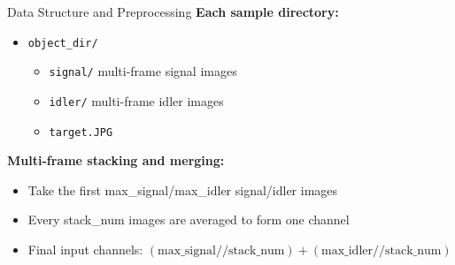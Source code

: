 \documentclass{beamer}
\begin{document}
\begin{frame}{Data Structure and Preprocessing}
\textbf{Each sample directory:}
\begin{itemize}
  \item \texttt{object_dir/}
  \begin{itemize}
    \item \texttt{signal/} \hspace{1em}  multi-frame signal images
    \item \texttt{idler/} \hspace{1em}  multi-frame idler images
    \item \texttt{target.JPG}
  \end{itemize}
\end{itemize}
\vspace{0.5em}
\textbf{Multi-frame stacking and merging:}
\begin{itemize}
    \item Take the first max_signal/max_idler signal/idler images
    \item Every stack_num images are averaged to form one channel
    \item Final input channels: $(\text{max_signal}//\text{stack_num}) + (\text{max_idler}//\text{stack_num})$
\end{itemize}
\end{frame}
\end{document}
